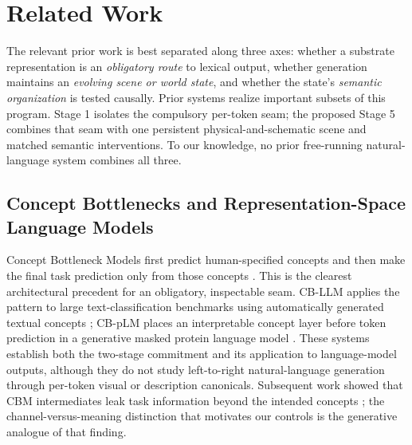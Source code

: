 \documentclass[11pt,a4paper]{article}
\begin{document}
\section{Related Work}

The relevant prior work is best separated along three axes: whether a substrate representation is an \emph{obligatory route} to lexical output, whether generation maintains an \emph{evolving scene or world state}, and whether the state's \emph{semantic organization} is tested causally. Prior systems realize important subsets of this program. Stage 1 isolates the compulsory per-token seam; the proposed Stage 5 combines that seam with one persistent physical-and-schematic scene and matched semantic interventions. To our knowledge, no prior free-running natural-language system combines all three.

\subsection{Concept Bottlenecks and Representation-Space Language Models}

Concept Bottleneck Models first predict human-specified concepts and then make the final task prediction only from those concepts \cite{cbm2020}. This is the clearest architectural precedent for an obligatory, inspectable seam. CB-LLM applies the pattern to large text-classification benchmarks using automatically generated textual concepts \cite{cbllm2024}; CB-pLM places an interpretable concept layer before token prediction in a generative masked protein language model \cite{cbplm2024}. These systems establish both the two-stage commitment and its application to language-model outputs, although they do not study left-to-right natural-language generation through per-token visual or description canonicals. Subsequent work showed that CBM intermediates leak task information beyond the intended concepts \cite{cbmleakage2022}; the channel-versus-meaning distinction that motivates our controls is the generative analogue of that finding.
\end{document}
